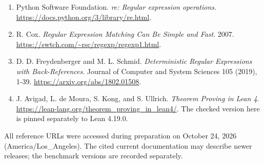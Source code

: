 \documentclass[
  11pt,
]{article}
\begin{document}
\begin{enumerate}
\item
  Python Software Foundation. \emph{re: Regular expression operations}.
  \url{https://docs.python.org/3/library/re.html}.
\item
  R. Cox. \emph{Regular Expression Matching Can Be Simple and Fast}.
  2007. \url{https://swtch.com/~rsc/regexp/regexp1.html}.
\item
  D. D. Freydenberger and M. L. Schmid. \emph{Deterministic Regular
  Expressions with Back-References}. Journal of Computer and System
  Sciences 105 (2019), 1-39. \url{https://arxiv.org/abs/1802.01508}.
\item
  J. Avigad, L. de Moura, S. Kong, and S. Ullrich. \emph{Theorem Proving
  in Lean 4}. \url{https://lean-lang.org/theorem_proving_in_lean4/}. The
  checked version here is pinned separately to Lean 4.19.0.
\end{enumerate}

All reference URLs were accessed during preparation on October 24, 2026
(America/Los\_Angeles). The cited current documentation may describe
newer releases; the benchmark versions are recorded separately.
\end{document}
